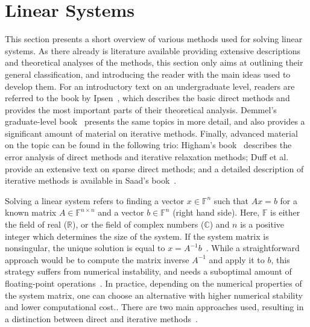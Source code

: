 \section{Linear Systems}
\label{introduction:sec:linear-systems}

This section presents a short overview of various methods used for solving
linear systems. As there already is literature available providing extensive
descriptions and theoretical analyses of the methods, this section only aims at
outlining their general classification, and introducing the reader with the main
ideas used to develop them. For an introductory text on an undergraduate level,
readers are referred to the book by Ipsen~\cite{Ipsen2009}, which describes the
basic direct methods and provides the most important parts of their theoretical
analysis. Demmel's graduate-level book~\cite{demmel} presents the same topics in
more detail, and also provides a significant amount of material on iterative
methods. Finally, advanced material on the topic can be found in the following
trio: Higham's book~\cite{higham} describes the error analysis of direct methods
and iterative relaxation methods; Duff et al.~\cite{duff} provide an extensive
text on sparse direct methods; and a detailed description of iterative methods
is available in Saad's book~\cite{saad}.

Solving a linear system refers to finding a vector $x \in \mathbb{F}^n$ such
that $Ax = b$ for a known matrix $A \in \mathbb{F}^{n \times n}$ and a vector $b
\in \mathbb{F}^n$ (right hand side). Here, $\mathbb{F}$ is
either the field of real ($\mathbb{R}$), or the field of complex numbers
($\mathbb{C}$) and $n$ is a positive integer which determines the size of the
system. If the system matrix is nonsingular, the unique solution is equal to $x
= A^{-1}b$~\cite{demmel}.  While a straightforward approach would be to compute
the matrix inverse $A^{-1}$ and apply it to $b$, this strategy suffers from
numerical instability, and needs a suboptimal  
amount of floating-point operations~\cite{demmel,Ipsen2009}. In practice,
depending on the numerical properties of the system matrix, one can choose an
alternative with higher numerical stability and lower computational cost.. There
are two main approaches used, resulting in a distinction between direct and
iterative methods~\cite{demmel}.

